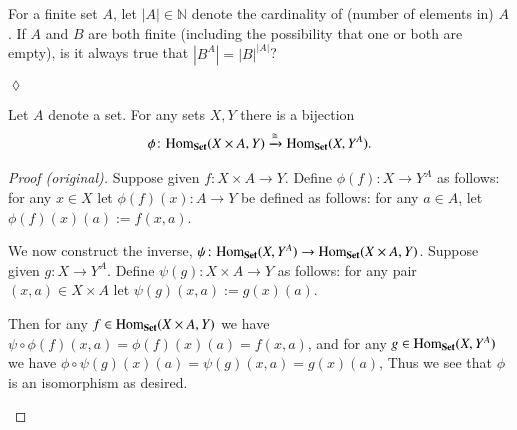 \documentclass{book}
\def\tn{\textnormal}
\def\NN{{\mathbb N}}
\def\Hom{\tn{Hom}}
\def\to{\rightarrow}
\def\taking{\colon}
\def\iso{\cong}
\newcommand{\To}[1]{\xrightarrow{#1}}
\def\Set{{\bf Set}}
\theoremstyle{theoremENG}
\theoremstyle{lemmaENG}
\theoremstyle{propositionENG}
\newtheorem{propositionENG}[subsubsection]{\begin{english}Proposition\end{english}}
\theoremstyle{corollaryENG}
\theoremstyle{factENG}
\theoremstyle{remarkENG}
\theoremstyle{exampleENG}
\theoremstyle{warningENG}
\theoremstyle{questionENG}
\theoremstyle{guessENG}
\theoremstyle{answerENG}
\theoremstyle{constructionENG}
\theoremstyle{rulesENG}
\theoremstyle{excENG}
\newtheorem{excENG}[subsubsection]{\begin{english}Exercise\end{english}}
\theoremstyle{appENG}
\theoremstyle{definitionENG}
\theoremstyle{notationENG}
\newtheorem{notationENG}[subsubsection]{\begin{english}Notation\end{english}}
\theoremstyle{conjectureENG}
\theoremstyle{postulateENG}
\newenvironment{proofENG}{\begin{proof}[Proof (original)]}{\end{proof}}
\newenvironment{exerciseENG}{\begin{excENG}}{\hspace*{\fill}$\lozenge$\end{excENG}}
\theoremstyle{theoremRUS}
\theoremstyle{lemmaRUS}
\theoremstyle{propositionRUS}
\theoremstyle{corollaryRUS}
\theoremstyle{factRUS}
\theoremstyle{remarkRUS}
\theoremstyle{exampleRUS}
\theoremstyle{warningRUS}
\theoremstyle{questionRUS}
\theoremstyle{guessRUS}
\theoremstyle{answerRUS}
\theoremstyle{constructionRUS}
\theoremstyle{rulesRUS}
\theoremstyle{excRUS}
\theoremstyle{appRUS}
\theoremstyle{definitionRUS}
\theoremstyle{notationRUS}
\theoremstyle{conjectureRUS}
\theoremstyle{postulateRUS}
\begin{document}
\begin{english}
\begin{notationENG}
\end{notationENG}

\begin{exerciseENG}

For a finite set $A$, let $|A|\in\NN$ denote the cardinality of (number of elements in) $A$. If $A$ and $B$ are both finite (including the possibility that one or both are empty), is it always true that $|B^A|=|B|^{|A|}$?

\begin{russian} \end{russian}

\end{exerciseENG}

\begin{propositionENG}[Currying]\label{prop:curry}

Let $A$ denote a set. For any sets $X,Y$ there is a bijection 
\begin{align}\label{dia:curry bijection}
\phi\taking\Hom_\Set(X\times A,Y)\To{\iso}\Hom_\Set(X,Y^A).
\end{align}

\begin{russian} \end{russian}

\end{propositionENG}

\begin{proofENG}

Suppose given $f\taking X\times A\to Y$. Define $\phi(f)\taking X\to Y^A$ as follows: for any $x\in X$ let $\phi(f)(x)\taking A\to Y$ be defined as follows: for any $a\in A$, let $\phi(f)(x)(a):=f(x,a)$. 

\begin{russian} \end{russian}

We now construct the inverse, $\psi\taking\Hom_\Set(X,Y^A)\to\Hom_\Set(X\times A,Y)$. Suppose given $g\taking X\to Y^A$. Define $\psi(g)\taking X\times A\to Y$ as follows: for any pair $(x,a)\in X\times A$ let $\psi(g)(x,a):=g(x)(a)$. 

\begin{russian} \end{russian}

Then for any $f\in\Hom_\Set(X\times A,Y)$ we have $\psi\circ\phi(f)(x,a)=\phi(f)(x)(a)=f(x,a)$, and for any $g\in\Hom_\Set(X,Y^A)$ we have $\phi\circ\psi(g)(x)(a)=\psi(g)(x,a)=g(x)(a)$, Thus we see that $\phi$ is an isomorphism as desired.

\begin{russian} \end{russian}


\end{proofENG}
\end{english}
\end{document}
